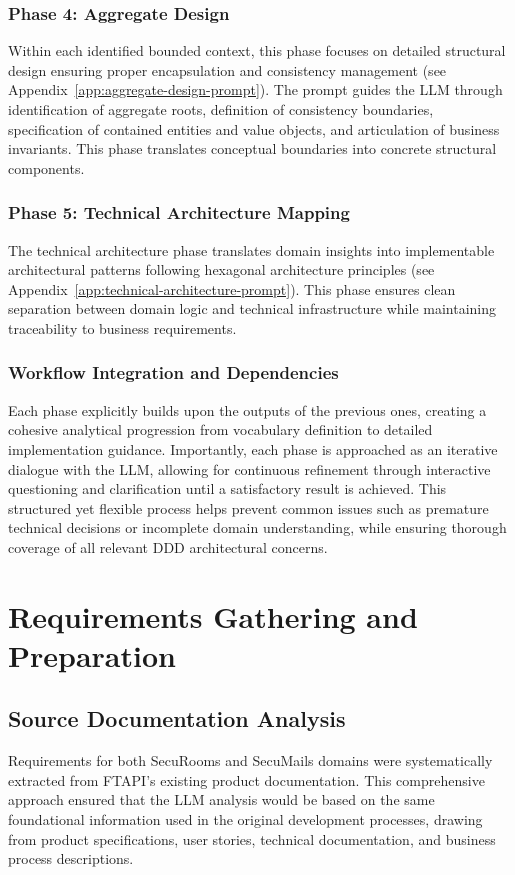 \subsubsection{Phase 4: Aggregate Design}
Within each identified bounded context, this phase focuses on detailed structural design ensuring proper encapsulation and consistency management (see Appendix~\ref{app:aggregate-design-prompt}). The prompt guides the LLM through identification of aggregate roots, definition of consistency boundaries, specification of contained entities and value objects, and articulation of business invariants. This phase translates conceptual boundaries into concrete structural components.

\subsubsection{Phase 5: Technical Architecture Mapping}
The technical architecture phase translates domain insights into implementable architectural patterns following hexagonal architecture principles (see Appendix~\ref{app:technical-architecture-prompt}). This phase ensures clean separation between domain logic and technical infrastructure while maintaining traceability to business requirements.

\subsubsection{Workflow Integration and Dependencies}
Each phase explicitly builds upon the outputs of the previous ones, creating a cohesive analytical progression from vocabulary definition to detailed implementation guidance. Importantly, each phase is approached as an iterative dialogue with the LLM, allowing for continuous refinement through interactive questioning and clarification until a satisfactory result is achieved. This structured yet flexible process helps prevent common issues such as premature technical decisions or incomplete domain understanding, while ensuring thorough coverage of all relevant DDD architectural concerns.

\section{Requirements Gathering and Preparation}

\subsection{Source Documentation Analysis}
Requirements for both SecuRooms and SecuMails domains were systematically extracted from FTAPI's existing product documentation. This comprehensive approach ensured that the LLM analysis would be based on the same foundational information used in the original development processes, drawing from product specifications, user stories, technical documentation, and business process descriptions.

